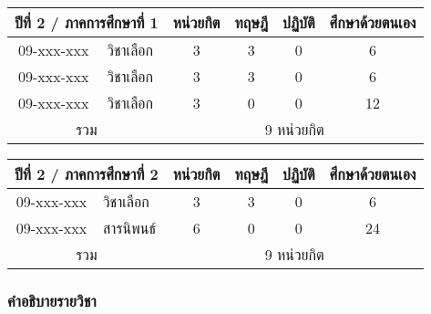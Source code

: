 \vspace{5ex}\par\noindent
\begin{tabular}{|cp{}|cccc|}
\hline
\multicolumn{2}{|c|}{ปีที่ 2 / ภาคการศึกษาที่ 1} & \multicolumn{1}{c|}{หน่วยกิต} & \multicolumn{1}{c|}{ทฤษฎี} & \multicolumn{1}{c|}{ปฏิบัติ} & ศึกษาด้วยตนเอง \\ \hline
\multicolumn{1}{|c|}{09-xxx-xxx}  & วิชาเลือก  & \multicolumn{1}{c|}{3}        & \multicolumn{1}{c|}{3}     & \multicolumn{1}{c|}{0}       & 6             \\ \hline
\multicolumn{1}{|c|}{09-xxx-xxx}  & วิชาเลือก  & \multicolumn{1}{c|}{3}        & \multicolumn{1}{c|}{3}     & \multicolumn{1}{c|}{0}       & 6             \\ \hline
\multicolumn{1}{|c|}{09-xxx-xxx}  & วิชาเลือก & \multicolumn{1}{c|}{3}        & \multicolumn{1}{c|}{0}     & \multicolumn{1}{c|}{0}       & 12             \\ \hline
\multicolumn{2}{|c|}{รวม}                        & \multicolumn{4}{c|}{9 หน่วยกิต}                                                                            \\ \hline
\end{tabular}

\vspace{5ex}\par\noindent
\begin{tabular}{|cp{}|cccc|}
\hline
\multicolumn{2}{|c|}{ปีที่ 2 / ภาคการศึกษาที่ 2} & \multicolumn{1}{c|}{หน่วยกิต} & \multicolumn{1}{c|}{ทฤษฎี} & \multicolumn{1}{c|}{ปฏิบัติ} & ศึกษาด้วยตนเอง \\ \hline
\multicolumn{1}{|c|}{09-xxx-xxx}  & วิชาเลือก  & \multicolumn{1}{c|}{3}        & \multicolumn{1}{c|}{3}     & \multicolumn{1}{c|}{0}       & 6             \\ \hline
\multicolumn{1}{|c|}{09-xxx-xxx}  & สารนิพนธ์ & \multicolumn{1}{c|}{6}        & \multicolumn{1}{c|}{0}     & \multicolumn{1}{c|}{0}       & 24             \\ \hline
\multicolumn{2}{|c|}{รวม}                        & \multicolumn{4}{c|}{9 หน่วยกิต}                                                                            \\ \hline
\end{tabular}


\clearpage
\subsubsection{คำอธิบายรายวิชา}


%
%
%
%



























